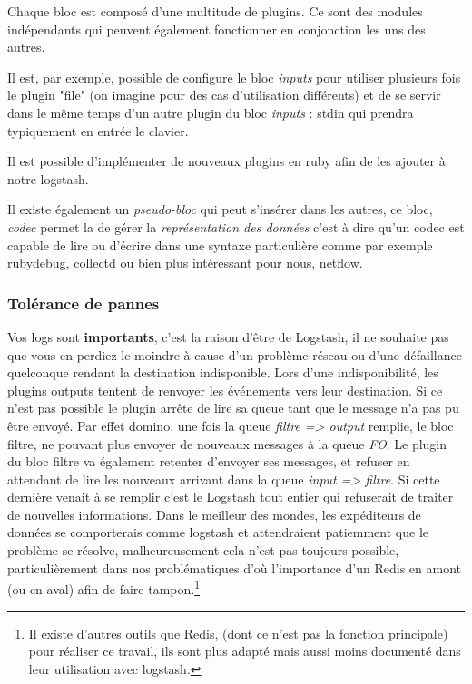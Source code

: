 Chaque bloc est composé d'une multitude de plugins. Ce sont des modules indépendants
qui peuvent également fonctionner en conjonction les uns des autres.

Il est, par exemple, possible de configure le bloc \emph{inputs} pour utiliser 
plusieurs fois le plugin "file" (on imagine pour des cas d'utilisation différents) 
et de se servir dans le même temps d'un autre plugin du bloc \emph{inputs} : stdin 
qui prendra typiquement en entrée le clavier.


Il est possible d'implémenter de nouveaux plugins en ruby afin de les ajouter à
notre logstash.

Il existe également un \textit{pseudo-bloc} qui peut s'insérer dans les autres, ce 
bloc, \emph{codec} permet la de gérer la \textit{représentation des données} c'est 
à dire qu'un codec est capable de lire ou d'écrire dans une syntaxe particulière 
comme par exemple rubydebug, collectd ou bien plus intéressant pour nous, netflow.




\subsubsection{Tolérance de pannes}
Vos logs sont \textbf{importants}, c'est la raison d'être de Logstash, il ne souhaite 
pas que vous en perdiez le moindre à cause d'un problème réseau ou d'une défaillance
quelconque rendant la destination indisponible.
Lors d'une indisponibilité, les plugins outputs tentent de renvoyer les événements 
vers leur destination. Si ce n'est pas possible le plugin arrête de lire sa queue 
tant que le message n'a pas pu être envoyé. Par effet domino, une fois la queue 
\textit{filtre => output} remplie, le bloc filtre, ne pouvant plus envoyer de nouveaux 
messages à la queue \textit{FO}. Le plugin du bloc filtre va également retenter 
d'envoyer ses messages, et refuser en attendant de lire les nouveaux arrivant dans 
la queue \textit{input => filtre}.
Si cette dernière venait à se remplir c'est le Logstash tout entier qui refuserait de 
traiter de nouvelles informations. Dans le meilleur des mondes, les expéditeurs de
données se comporterais comme logstash et attendraient patiemment que le problème
se résolve, malheureusement cela n'est pas toujours possible, particulièrement dans
nos problématiques d'où l'importance d'un Redis en amont (ou en aval) afin de 
faire tampon.\footnote{Il existe d'autres outils que Redis, (dont ce n'est pas la fonction
principale) pour réaliser ce travail, ils sont plus adapté mais aussi moins documenté
dans leur utilisation avec logstash.}

